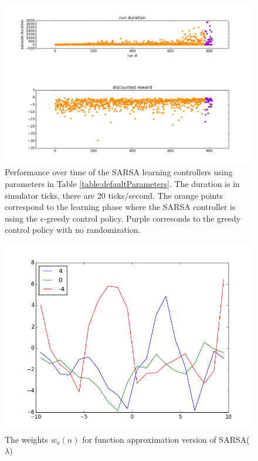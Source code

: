 \documentclass{article}
\begin{document}
\begin{figure}
\centering
\includegraphics[scale=0.5]{figures/sarsaDiscrete_lam_0_7_6500_time_series_learned_controllers.png}
\caption{$\lambda = 0.7$}
\label{figures/sarsaDiscrete_lam_0_7_6500_time_series_learned_controllers.png}
\caption{Performance over time of the SARSA learning controllers using parameters in Table \ref{table:defaultParameters}. The duration is in simulator ticks, there are 20 ticks/second. The orange points correspond to the learning phase where the SARSA controller is using the $\epsilon$-greedy control policy. Purple corresonds to the greedy control policy with no randomization.}
\end{figure}


\begin{figure}
\centering
\includegraphics[scale=0.5]{figures/sarsa_cts_weights.png}
\caption{The weights $w_a(n)$ for function approximation version of SARSA($\lambda$)}
\label{figures/sarsa_cts_weights.png}
\end{figure}
\end{document}
